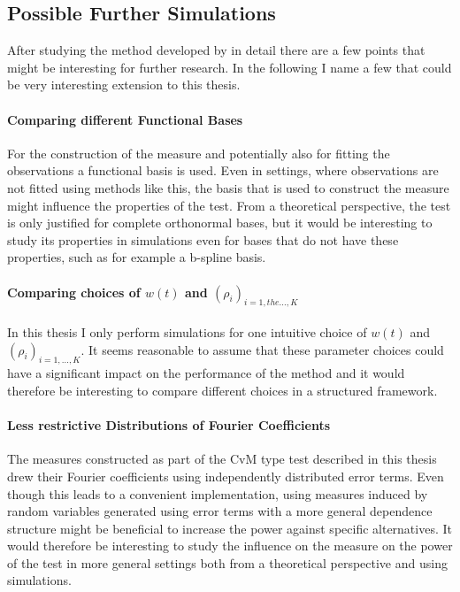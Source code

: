 \documentclass[12pt, a4paper]{article}
\theoremstyle{MAstyle} \newtheorem{assumption}{Assumption}[section]
\theoremstyle{MAstyle} \newtheorem{definition}{Definition}[section]
\theoremstyle{MAstyle} \newtheorem{theorem}{Theorem}[section]
\begin{document}
		\subsection{Possible Further Simulations}
			After studying the method developed by \cite{bugni_permutation_2021} in detail there are a few points that might be interesting for further research. In the following I name a few that could be very interesting extension to this thesis.
			
			\paragraph{Comparing different Functional Bases\\} 
			For the construction of the measure and potentially also for fitting the observations a functional basis is used. Even in settings, where observations are not fitted using methods like this, the basis that is used to construct the measure might influence the properties of the test. From a theoretical perspective, the test is only justified for complete orthonormal bases, but it would be interesting to study its properties in simulations even for bases that do not have these properties, such as for example a b-spline basis.
		
			\paragraph{Comparing choices of $w(t)$ and  $\left(\rho_i\right)_{i = 1, the \dots, K}$\\}
			In this thesis I only perform simulations for one intuitive choice of $w(t)$ and $\left(\rho_i\right)_{i = 1, \dots, K}$. It seems reasonable to assume that these parameter choices could have a significant impact on the performance of the method and it would therefore be interesting to compare different choices in a structured framework.
			
			\paragraph{Less restrictive Distributions of Fourier Coefficients\\}
			The measures constructed as part of the CvM type test described in this thesis drew their Fourier coefficients using independently distributed error terms. Even though this leads to a convenient implementation, using measures induced by random variables generated using error terms with a more general dependence structure might be beneficial to increase the power against specific alternatives. It would therefore be interesting to study the influence on the measure on the power of the test in more general settings both from a theoretical perspective and using simulations. 
		
\end{document}
